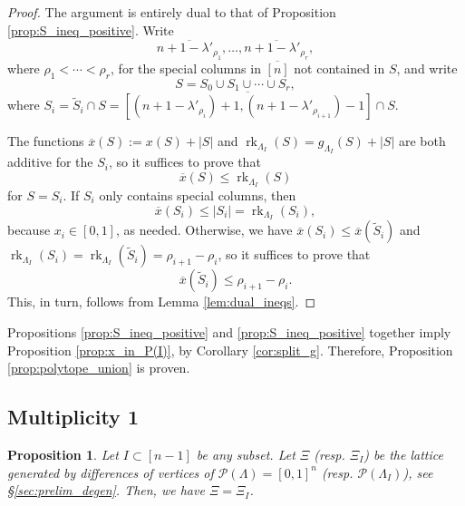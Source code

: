 \documentclass[12pt]{amsart}
\newtheorem{proposition}[definition]{Proposition}
\DeclareMathOperator{\rk}{rk}
\newcommand{\cP}{\mathcal{P}}
\begin{document}
\begin{proof}
The argument is entirely dual to that of Proposition \ref{prop:S_ineq_positive}. Write 
\begin{equation*}
    \overline{n+1-\lambda'_{\rho_1}},\ldots,\overline{n+1-\lambda'_{\rho_r}},
\end{equation*}
where $\rho_1<\cdots<\rho_r$, for the special columns in $\overline{[n]}$ not contained in $S$, and write
\begin{equation*}
    S=S_0\cup S_1\cup\cdots\cup S_r,
\end{equation*}
where $S_i=\widetilde{S}_i\cap S=\overline{[(n+1-\lambda'_{\rho_{i}})+1,(n+1-\lambda'_{\rho_{i+1}})-1]}\cap S$.

The functions $\overline{x}(S):=x(S)+|S|$ and $\rk_{\Lambda_I}(S)=g_{\Lambda_I}(S)+|S|$ are both additive for the $S_i$, so it suffices to prove that
\begin{equation*}
\overline{x}(S)\le \rk_{\Lambda_I}(S)
\end{equation*}
for $S=S_i$. If $S_i$ only contains special columns, then
\begin{equation}\label{eq:x-bar-ineq}
\overline{x}(S_i)\le |S_i|=\rk_{\Lambda_I}(S_i),
\end{equation}
because $x_i\in[0,1]$, as needed. Otherwise, we have $\overline{x}(S_i)\le \overline{x}(\widetilde{S}_i)$ and $\rk_{\Lambda_I}(S_i)=\rk_{\Lambda_I}(\widetilde{S}_i)=\rho_{i+1}-\rho_i$, so it suffices to prove that
\begin{equation*}
\overline{x}(\widetilde{S}_i)\le \rho_{i+1}-\rho_i.
\end{equation*}
This, in turn, follows from Lemma \ref{lem:dual_ineqs}.
\end{proof}

Propositions \ref{prop:S_ineq_positive} and \ref{prop:S_ineq_positive} together imply Proposition \ref{prop:x_in_P(I)}, by Corollary \ref{cor:split_g}. Therefore, Proposition \ref{prop:polytope_union} is proven.

\subsection{Multiplicity 1}\label{sec:multiplicity_1}

\begin{proposition}\label{prop:multiplicity_1}
    Let $I\subset[n-1]$ be any subset. Let $\Xi$ (resp. $\Xi_I$) be the lattice generated by differences of vertices of $\cP(\Lambda)=[0,1]^n$ (resp. $\cP(\Lambda_I)$), see \S\ref{sec:prelim_degen}. Then, we have $\Xi=\Xi_I$.
\end{proposition}
\end{document}
